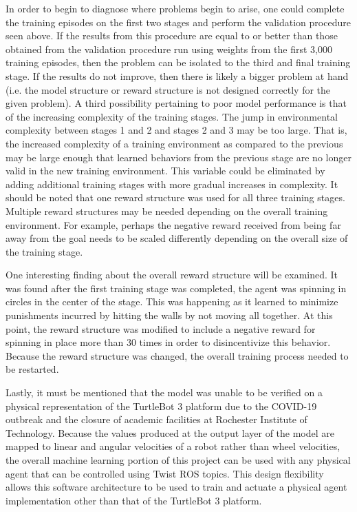\documentclass[conference]{IEEEtran}
\begin{document}
In order to begin to diagnose where problems begin to arise, one could complete the training episodes on the first two stages and perform the validation procedure seen above. If the results from this procedure are equal to or better than those obtained from the validation procedure run using weights from the first 3,000 training episodes, then the problem can be isolated to the third and final training stage. If the results do not improve, then there is likely a bigger problem at hand (i.e. the model structure or reward structure is not designed correctly for the given problem). A third possibility pertaining to poor model performance is that of the increasing complexity of the training stages. The jump in environmental complexity between stages 1 and 2 and stages 2 and 3 may be too large. That is, the increased complexity of a training environment as compared to the previous may be large enough that learned behaviors from the previous stage are no longer valid in the new training environment. This variable could be eliminated by adding additional training stages with more gradual increases in complexity. It should be noted that one reward structure was used for all three training stages. Multiple reward structures may be needed depending on the overall training environment. For example, perhaps the negative reward received from being far away from the goal needs to be scaled differently depending on the overall size of the training stage.  

One interesting finding about the overall reward structure will be examined. It was found after the first training stage was completed, the agent was spinning in circles in the center of the stage. This was happening as it learned to minimize punishments incurred by hitting the walls by not moving all together. At this point, the reward structure was modified to include a negative reward for spinning in place more than 30 times in order to disincentivize this behavior. Because the reward structure was changed, the overall training process needed to be restarted. 

Lastly, it must be mentioned that the model was unable to be verified on a physical representation of the TurtleBot 3 platform due to the COVID-19 outbreak and the closure of academic facilities at Rochester Institute of Technology. Because the values produced at the output layer of the model are mapped to linear and angular velocities of a robot rather than wheel velocities, the overall machine learning portion of this project can be used with any physical agent that can be controlled using Twist ROS topics. This design flexibility allows this software architecture to be used to train and actuate a physical agent implementation other than that of the TurtleBot 3 platform. 
\end{document}
